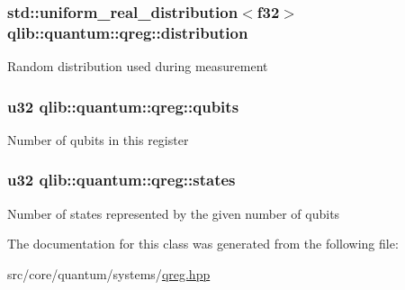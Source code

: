 \subsubsection[{\texorpdfstring{distribution}{distribution}}]{\setlength{\rightskip}{0pt plus 5cm}std\+::uniform\+\_\+real\+\_\+distribution$<$f32$>$ qlib\+::quantum\+::qreg\+::distribution\hspace{0.3cm}{\ttfamily [private]}}\hypertarget{classqlib_1_1quantum_1_1qreg_aabd605497170f57cdbb175d21c99662e}{}\label{classqlib_1_1quantum_1_1qreg_aabd605497170f57cdbb175d21c99662e}
Random distribution used during measurement 
\subsubsection[{\texorpdfstring{qubits}{qubits}}]{\setlength{\rightskip}{0pt plus 5cm}u32 qlib\+::quantum\+::qreg\+::qubits\hspace{0.3cm}{\ttfamily [private]}}\hypertarget{classqlib_1_1quantum_1_1qreg_a2d7c33e71a77d860d50d53a258a71a6f}{}\label{classqlib_1_1quantum_1_1qreg_a2d7c33e71a77d860d50d53a258a71a6f}
Number of qubits in this register 
\subsubsection[{\texorpdfstring{states}{states}}]{\setlength{\rightskip}{0pt plus 5cm}u32 qlib\+::quantum\+::qreg\+::states\hspace{0.3cm}{\ttfamily [private]}}\hypertarget{classqlib_1_1quantum_1_1qreg_ad0e84b959f93f3da6ed81eb096f809d1}{}\label{classqlib_1_1quantum_1_1qreg_ad0e84b959f93f3da6ed81eb096f809d1}
Number of states represented by the given number of qubits 

The documentation for this class was generated from the following file\+:\begin{DoxyCompactItemize}
\item 
src/core/quantum/systems/\hyperlink{qreg_8hpp}{qreg.\+hpp}\end{DoxyCompactItemize}

